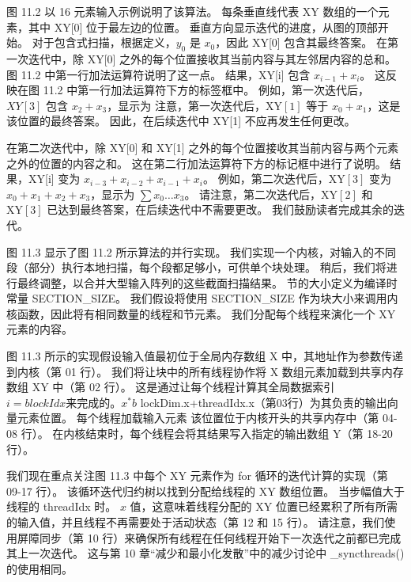 图 11.2 以 16 元素输入示例说明了该算法。 每条垂直线代表 XY 数组的一个元素，其中 XY[0] 位于最左边的位置。 垂直方向显示迭代的进度，从图的顶部开始。 对于包含式扫描，根据定义，$y_{0}$ 是 $x_{0}$，因此 XY[0] 包含其最终答案。 在第一次迭代中，除 XY[0] 之外的每个位置接收其当前内容与其左邻居内容的总和。 图 11.2 中第一行加法运算符说明了这一点。 结果，XY[i] 包含 $x_{i-1}+x_{i}$。 这反映在图 11.2 中第一行加法运算符下方的标签框中。 例如，第一次迭代后，$X Y[3]$ 包含 $x_{2}+x_{3}$，显示为 注意，第一次迭代后，$\mathrm{XY}[1]$ 等于 $ x_{0}+x_{1}$，这是该位置的最终答案。 因此，在后续迭代中 XY[1] 不应再发生任何更改。

在第二次迭代中，除 XY[0] 和 XY[1] 之外的每个位置接收其当前内容与两个元素之外的位置的内容之和。 这在第二行加法运算符下方的标记框中进行了说明。 结果，XY[i] 变为 $x_{i-3}+x_{i-2}+x_{i-1}+x_{i}$。 例如，第二次迭代后，$\mathrm{XY}[3]$ 变为 $x_{0}+x_{1}+x_{2}+x_{3}$，显示为 $\sum x_{0} \ldots x_{3}$。 请注意，第二次迭代后，$\mathrm{XY}[2]$ 和 $\mathrm{XY}[3]$ 已达到最终答案，在后续迭代中不需要更改。 我们鼓励读者完成其余的迭代。

图 11.3 显示了图 11.2 所示算法的并行实现。 我们实现一个内核，对输入的不同段（部分）执行本地扫描，每个段都足够小，可供单个块处理。 稍后，我们将进行最终调整，以合并大型输入阵列的这些截面扫描结果。 节的大小定义为编译时常量 SECTION\_SIZE。 我们假设将使用 SECTION\_SIZE 作为块大小来调用内核函数，因此将有相同数量的线程和节元素。 我们分配每个线程来演化一个 $\mathrm{XY}$ 元素的内容。

图 11.3 所示的实现假设输入值最初位于全局内存数组 $\mathrm{X}$ 中，其地址作为参数传递到内核（第 01 行）。 我们将让块中的所有线程协作将 $\mathrm{X}$ 数组元素加载到共享内存数组 XY 中（第 02 行）。 这是通过让每个线程计算其全局数据索引 $i=b l o c k I d x 来完成的。 x^{*} b$ lockDim.x+threadIdx.x（第03行）为其负责的输出向量元素位置。 每个线程加载输入元素
该位置位于内核开头的共享内存中（第 04-08 行）。 在内核结束时，每个线程会将其结果写入指定的输出数组 Y（第 18-20 行）。

我们现在重点关注图 11.3 中每个 $\mathrm{XY}$ 元素作为 for 循环的迭代计算的实现（第 09-17 行）。 该循环迭代归约树以找到分配给线程的 $\mathrm{XY}$ 数组位置。 当步幅值大于线程的 threadIdx 时。 $x$ 值，这意味着线程分配的 XY 位置已经累积了所有所需的输入值，并且线程不再需要处于活动状态（第 12 和 15 行）。 请注意，我们使用屏障同步（第 10 行）来确保所有线程在任何线程开始下一次迭代之前都已完成其上一次迭代。 这与第 10 章“减少和最小化发散”中的减少讨论中 \_syncthreads() 的使用相同。

